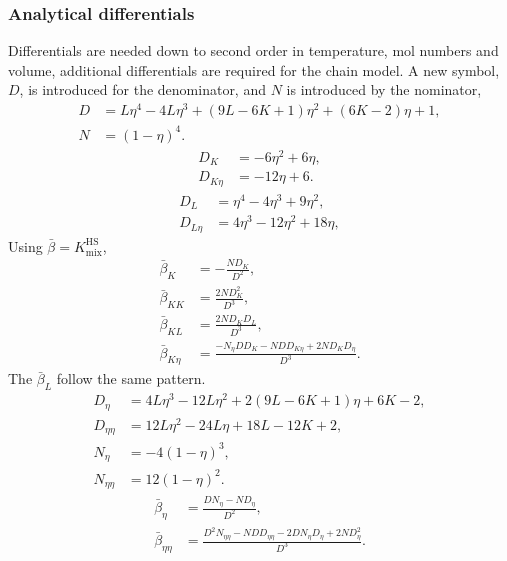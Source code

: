 \documentclass[english]{../thermomemo/thermomemo}
\newcommand*{\lb}{\left(}
\newcommand*{\rb}{\right)}
\newcommand{\hs}{\text{HS}\xspace}
\newcommand{\mix}{\ensuremath{\text{mix}}\xspace}
\begin{document}
\subsubsection{Analytical differentials}
Differentials are needed down to second order in temperature, mol
numbers and volume, additional differentials are required for the
chain model.
%
A new symbol, $D$, is introduced for the denominator, and $N$ is
introduced by the nominator,
\begin{align}
  \label{eq:D_HS_mix}
  D &= L \eta^4 - 4 L \eta^3 + \lb 9 L - 6 K + 1 \rb \eta^2 + \lb 6 K - 2 \rb \eta + 1, \\
  N &= \lb 1 - \eta \rb^4. \label{eq:N_HS_mix}
\end{align}
\begin{align}
  \label{eq:dDdK_HS_mix}
  D_K &= -6 \eta^2 + 6 \eta,\\
  \label{eq:d2DdKdeta_HS_mix}
  D_{K\eta} &= -12 \eta + 6.
\end{align}
\begin{align}
  \label{eq:dDdL_HS_mix}
  D_L &= \eta^4 - 4\eta^3 + 9\eta^2,\\
  \label{eq:d2DdLdeta_HS_mix}
  D_{L\eta} &=  4 \eta^3 - 12\eta^2 + 18\eta,
\end{align}
Using $\bar{\beta} = K_\mix^\hs$,
\begin{align}
  \label{eq:dKhsdK_HS_mix}
  \bar{\beta}_K &= -\frac{N D_K}{D^2}, \\
  \label{eq:dKhs2dK2_HS_mix}
  \bar{\beta}_{KK} &= \frac{2 N D_K^2}{D^3}, \\
  \label{eq:dKhs2dKdL_HS_mix}
  \bar{\beta}_{KL} &= \frac{2 N D_K D_L}{D^3}, \\
  \label{eq:dKhs2dKdeta_HS_mix}
  \bar{\beta}_{K\eta} &= \frac{ - N_\eta D D_K - N D D_{K\eta} + 2 N D_K D_\eta }{D^3}.
\end{align}
The $\bar{\beta}_{L}$ follow the same pattern.
\begin{align}
  \label{eq:dDdeta_HS_mix}
  D_{\eta} &= 4 L \eta^3 - 12 L \eta^2 + 2 \lb 9 L - 6 K + 1 \rb \eta + 6 K - 2,\\
  \label{eq:d2Ddeta2_HS_mix}
  D_{\eta\eta} &= 12 L \eta^2 - 24 L \eta + 18 L - 12 K + 2, \\
  \label{eq:dNdeta_HS_mix}
  N_{\eta} &=  -4 \lb 1 - \eta \rb^3,\\
  \label{eq:d2Ndeta2_HS_mix}
  N_{\eta\eta} &= 12 \lb 1 - \eta \rb^2 .
\end{align}
\begin{align}
  \label{eq:dKhsdeta_HS_mix}
  \bar{\beta}_{\eta} &= \frac{D N_\eta - N D_\eta}{D^2}, \\
  \label{eq:dKhs2deta2_HS_mix}
  \bar{\beta}_{\eta\eta} &= \frac{D^2 N_{\eta\eta} - N D D_{\eta\eta} - 2 D N_\eta D_\eta + 2 N D_\eta^2}{D^3}.
\end{align}
\end{document}
